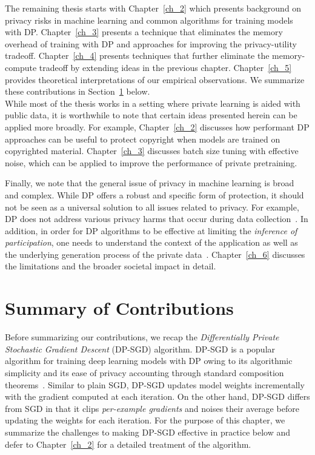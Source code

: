 The remaining thesis starts with Chapter~\ref{ch_2} which presents background on privacy risks in machine learning and common algorithms for training models with DP.
Chapter~\ref{ch_3} presents a technique that eliminates the memory overhead of training with DP and approaches for improving the privacy-utility tradeoff.
Chapter~\ref{ch_4} presents techniques that further eliminate the memory-compute tradeoff by extending ideas in the previous chapter.
Chapter~\ref{ch_5} provides theoretical interpretations of our empirical observations.
We summarize these contributions in Section~\ref{sec:overview_of_results} below.\\

While most of the thesis works in a setting where private learning is aided with public data, it is worthwhile to note that certain ideas presented herein can be applied more broadly. 
For example, Chapter~\ref{ch_2} discusses how performant DP approaches can be useful to protect copyright when models are trained on copyrighted material.
Chapter~\ref{ch_3} discusses batch size tuning with effective noise, which can be applied to improve the performance of private pretraining.

Finally, we note that the general issue of privacy in machine learning is broad and complex.
While DP offers a robust and specific form of protection, it should not be seen as a universal solution to all issues related to privacy.
For example, DP does not address various privacy harms that occur during data collection~\cite{solove2005taxonomy}.
In addition, in order for DP algorithms to be effective at limiting the \emph{inference of participation}, one needs to understand the context of the application as well as the underlying generation process of the private data~\cite{kifer2011no}. 
Chapter~\ref{ch_6} discusses the limitations and the broader societal impact in detail.

\section{Summary of Contributions}\label{sec:overview_of_results}

Before summarizing our contributions, we recap the \emph{Differentially Private Stochastic Gradient Descent} (DP-SGD) algorithm.
DP-SGD is a popular algorithm for training deep learning models with DP owing to its algorithmic simplicity and its ease of privacy accounting through standard composition theorems~\cite{dwork2014algorithmic}.
Similar to plain SGD, DP-SGD updates model weights incrementally with the gradient computed at each iteration.
On the other hand, DP-SGD differs from SGD in that it clips \emph{per-example gradients} and noises their average before updating the weights for each iteration. 
For the purpose of this chapter, we summarize the challenges to making DP-SGD effective in practice below and defer to Chapter~\ref{ch_2} for a detailed treatment of the algorithm. 

